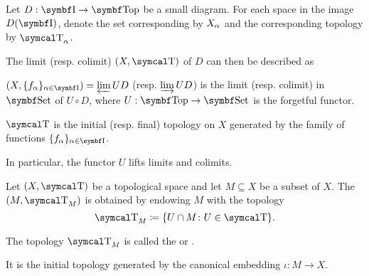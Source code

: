 \begin{proposition}\label{thm:initial_final_topology_limit}\cite{nLab:top}
  Let \( D: \Bold I \to \Cat{Top} \) be a small diagram. For each space in the image \( D(\Bold I) \), denote the set corresponding by \( X_\alpha \) and the corresponding topology by \( \CT_\al \).

  The limit (resp. colimit) \( (X, \CT) \) of \( D \) can then be described as
  \begin{defenum}
    \item \( (X, \{ f_\al \}_{\al \in \Cat{I}}) = \varprojlim UD \) (resp. \( \varinjlim UD \)) is the limit (resp. colimit) in \( \Bold{Set} \) of \( U \circ D \), where \( U: \Bold{Top} \to \Bold{Set} \) is the forgetful functor.
    \item \( \CT \) is the initial (resp. final) topology on \( X \) generated by the family of functions \( \{ f_\al \}_{\al \in \Cat{I}} \).
  \end{defenum}

  In particular, the functor \( U \) lifts limits and colimits.
\end{proposition}

\begin{definition}\label{def:topological_subspace}
  Let \( (X, \CT) \) be a topological space and let \( M \subseteq X \) be a subset of \( X \). The  \( (M, \CT_M) \) is obtained by endowing \( M \) with the topology
  \begin{equation*}
    \CT_M \coloneqq \{ U \cap M \colon U \in \CT \}.
  \end{equation*}

  The topology \( \CT_M \) is called the  or .

  It is the initial topology generated by the canonical embedding \( \iota: M \to X \).
\end{definition}

